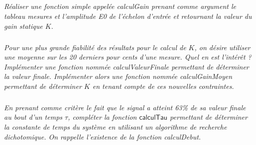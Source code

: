 \documentclass[10pt]{article}
\begin{document}
\subparagraph{}
\textit{Réaliser une fonction simple appelée \textsl{calculGain} prenant comme argument le tableau \textsl{mesures} et l'amplitude \textsf{E0} de l'échelon d'entrée et retournant la valeur du gain statique $K$.}





\subparagraph{}
\textit{Pour une plus grande fiabilité des résultats pour le calcul de $K$, on désire utiliser une moyenne sur les 20 derniers pour cents d'une mesure. Quel en est l'intérêt ? Implémenter une fonction nommée \textsl{calculValeurFinale} permettant de déterminer la valeur finale. Implémenter alors une fonction nommée  \textsl{calculGainMoyen} permettant de déterminer $K$ en tenant compte de ces nouvelles contraintes.}


%    



\subparagraph{}
\textit{En prenant comme critère le fait que le signal a atteint 63\% de sa valeur finale au bout d'un temps $\tau$, compléter la fonction $\textsf{calculTau}$ permettant de déterminer la constante de temps du système en utilisant un algorithme de recherche dichotomique. On rappelle l'existence de la fonction \textsf{calculDebut}.}


 
\end{document}
